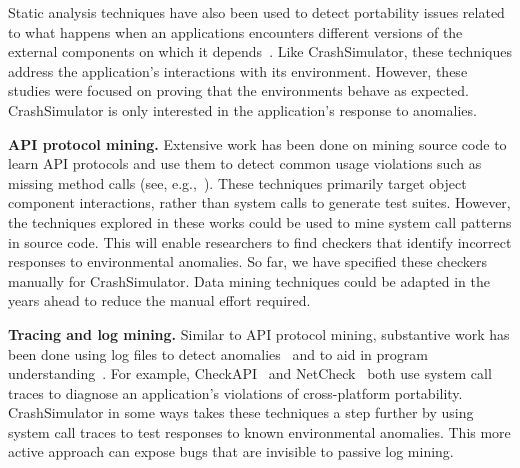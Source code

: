 Static analysis techniques have also been
used to detect portability issues related to what happens when an
applications encounters different
versions of the external components on which
it depends~\cite{silakov2010improving, javacompliance-www}. Like
CrashSimulator, these techniques
address the application's interactions with its
environment. However, these studies were focused on proving that the
environments behave as expected.
CrashSimulator is only interested in the application's
response to anomalies.

\iffalse
\noindent
{\bf Specification and run-time verification.}
Substantial work has been done in validating API and protocol behaviors,
e.g., finding faults in the Linux TCP implementation, SSH2 and
RCP~\cite{Udrea:2008}, BGP configuration~\cite{Feamster:2005}, and
identifying network vulnerabilities~\cite{ritchey-sp00}.
\fi

\noindent
{\bf API protocol mining.}
Extensive work has been done on mining source code to learn API protocols
and use them to detect common usage violations such as missing method calls
(see, e.g.,~\cite{mariani2007compatibility,
DBLP:journals/ase/WasylkowskiZ11, DBLP:conf/icse/PradelJAG12,
DBLP:journals/tosem/MonperrusM13, DBLP:conf/icse/JamrozikSZ16}). These
techniques primarily target object component interactions, rather than
system calls to generate test suites. However, the techniques explored in
these works could be used to mine system call patterns in source code.
This will enable researchers
to find checkers that identify incorrect responses to environmental
anomalies. So far, we have specified these checkers manually for
CrashSimulator.  Data mining techniques could be adapted in the years
ahead to reduce the manual effort required.

\noindent
{\bf Tracing and log mining.}
Similar to API protocol mining, substantive work has been done using
log files to detect anomalies~\cite{pinpoint,
jiang_abnormal_trace_detection_icac_2005, xu2009detecting, lou2010mining2}
and to aid in program understanding~\cite{yuan2010sherlog,
beschastnikh_synoptic_fse_2011, csight_icse_2014}.
For example, CheckAPI~\cite{rasley2015detecting}
and NetCheck~\cite{Zhuang_NSDI_2014} both
use system call traces to diagnose an application's violations of
cross-platform portability.  CrashSimulator in some ways takes these
techniques a step further by using
system call traces
to test responses to known environmental anomalies.
This more active approach can expose bugs that
are invisible to passive log mining.


